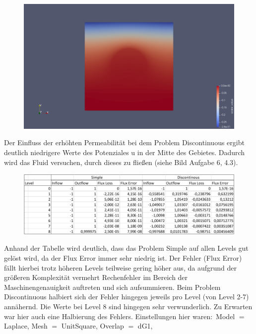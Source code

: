 \documentclass[12pt,a4paper]{scrartcl}
\numberwithin{equation}{section}
\begin{document}
\begin{enumerate}[label=(\roman*)]
\begin{figure}[H]
	\centering
	 \includegraphics[width=\textwidth]{../Problem_DiscontinousMesh_UnitSquarelevel_8/u.png}
\end{figure} 
Der Einfluss der erhöhten Permeabilität bei dem Problem Discontinuous ergibt deutlich niedrigere Werte des Potenziales u in der Mitte des Gebietes. Dadurch wird das Fluid versuchen, durch dieses zu fließen (siehe Bild Aufgabe 6, 4.3).
\begin{figure}[H]
	\centering
	\captionabove{}
	\includegraphics[width=\textwidth]{../A4Tabelle.png}
\end{figure}
Anhand der Tabelle wird deutlich, dass das Problem Simple auf allen Levels gut gelöst wird, da der Flux Error immer sehr niedrig ist. Der Fehler (Flux Error) fällt hierbei trotz höheren Levels teilweise gering höher aus, da aufgrund der größeren Komplexität vermehrt Rechenfehler im Bereich der Maschinengenauigkeit auftreten und sich aufsummieren. 
\newline Beim Problem Discontinuous halbiert sich der Fehler hingegen jeweils pro Level (von Level 2-7)
 annähernd. Die Werte bei Level 8 sind hingegen sehr verwunderlich. Zu Erwarten war hier auch eine Halbierung des Fehlers. \newline
Einstellungen hier waren$:$
\newline
 Model $=$ Laplace, Mesh $=$ UnitSquare, Overlap $=$ dG1,

\end{enumerate}
\end{document}
